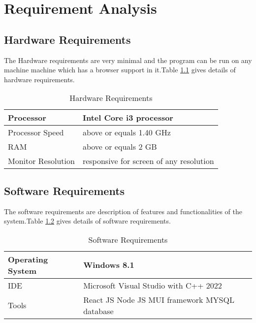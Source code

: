 \chapter{Requirement Analysis}
\section{Hardware Requirements}
The Hardware requirements are very minimal and the program can be run on any machine machine which has a browser support in it.Table \ref{T1} gives details of hardware requirements. 
\begin{table}[h!]
\caption{Hardware Requirements}
\label{T1}
\begin{center}
\begin{tabular}{ |p{4cm}|p{8cm}| }
\hline
 Processor & Intel Core i3 processor \\ 
\hline
Processor Speed  & above or equals 1.40 GHz  \\ 
\hline
RAM & above or equals 2 GB \\ 
\hline
Monitor Resolution	& responsive for screen of any resolution\\
\hline
\end{tabular}
\end{center}
\end{table}
\section{Software Requirements} 
The software requirements are description of features and functionalities of the system.Table \ref{T2} gives details of software requirements. \begin{table}[h!]
\caption{Software Requirements}
\label{T2}
\begin{center}
\begin{tabular}{ |p{4cm}|p{8cm}| }
\hline
Operating System & Windows 8.1 \\ 
\hline
IDE	& Microsoft Visual Studio with C++ 2022 \\ 
\hline Tools &
React JS\newline 
Node JS\newline
MUI framework\newline
MYSQL database\\ 
\hline
\end{tabular}
\end{center}
\end{table}

